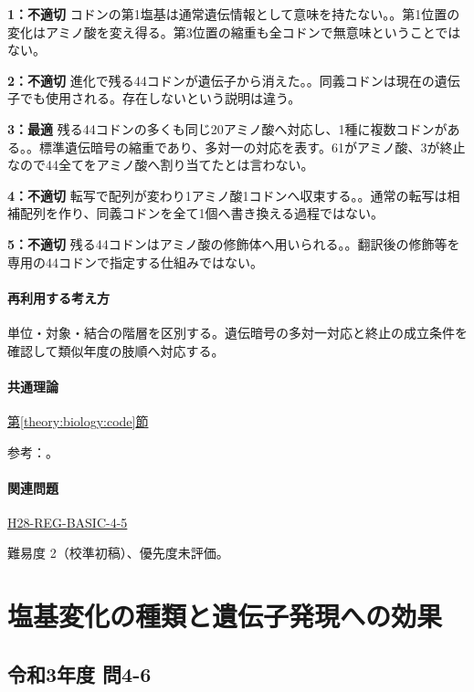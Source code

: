 \noindent\textbf{1：不適切} コドンの第1塩基は通常遺伝情報として意味を持たない。。第1位置の変化はアミノ酸を変え得る。第3位置の縮重も全コドンで無意味ということではない。\par

\noindent\textbf{2：不適切} 進化で残る44コドンが遺伝子から消えた。。同義コドンは現在の遺伝子でも使用される。存在しないという説明は違う。\par

\noindent\textbf{3：最適} 残る44コドンの多くも同じ20アミノ酸へ対応し、1種に複数コドンがある。。標準遺伝暗号の縮重であり、多対一の対応を表す。61がアミノ酸、3が終止なので44全てをアミノ酸へ割り当てたとは言わない。\par

\noindent\textbf{4：不適切} 転写で配列が変わり1アミノ酸1コドンへ収束する。。通常の転写は相補配列を作り、同義コドンを全て1個へ書き換える過程ではない。\par

\noindent\textbf{5：不適切} 残る44コドンはアミノ酸の修飾体へ用いられる。。翻訳後の修飾等を専用の44コドンで指定する仕組みではない。\par

\paragraph{再利用する考え方} 単位・対象・結合の階層を区別する。遺伝暗号の多対一対応と終止の成立条件を確認して類似年度の肢順へ対応する。

\paragraph{共通理論} \hyperref[theory:biology:code]{第\ref*{theory:biology:code}節}

\par 参考：\cite{nhgri_codon}。

\paragraph{関連問題} \hyperref[q:h28-reg-basic-4-5]{H28-REG-BASIC-4-5}

\par 難易度 2（校準初稿）、優先度未評価。

\section{塩基変化の種類と遺伝子発現への効果}

\subsection{令和3年度 問4-6}
\label{q:r03-reg-basic-4-6}

